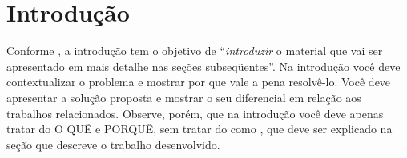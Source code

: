 \documentclass[twoside,english,brazilian]{UNISINOSmonografia}
\begin{document}
\tableofcontents

\chapter{Introdução}


Conforme , a introdução tem o objetivo de ``\emph{introduzir} o material que vai ser apresentado em mais detalhe nas seções subseqüentes''. Na introdução você deve contextualizar o problema e mostrar por que vale a pena resolvê-lo. Você deve apresentar a solução proposta e mostrar o seu diferencial em relação aos trabalhos relacionados. Observe, porém, que na introdução você deve apenas tratar do O QUÊ e PORQUÊ, sem tratar do como \cite{Hexsel11}, que deve ser explicado na seção que descreve o trabalho desenvolvido.
\end{document}
